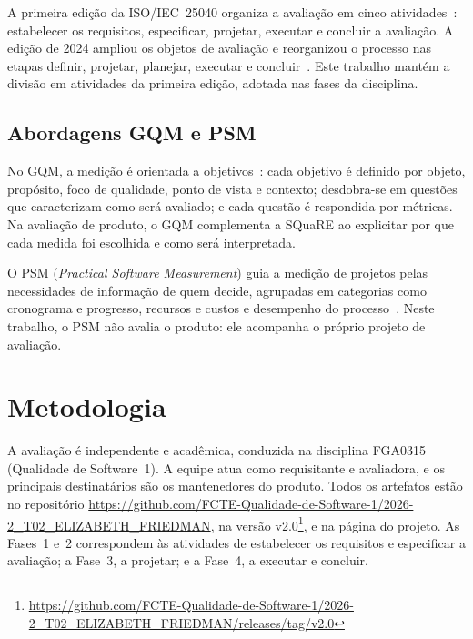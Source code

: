 \documentclass[12pt]{article}
\begin{document}
A primeira edição da ISO/IEC~25040 organiza a avaliação em cinco
atividades~\cite{iso25040v2011}: estabelecer os requisitos, especificar,
projetar, executar e concluir a avaliação. A edição de 2024 ampliou os objetos
de avaliação e reorganizou o processo nas etapas definir, projetar, planejar,
executar e concluir~\cite{iso25040}. Este trabalho mantém a divisão em
atividades da primeira edição, adotada nas fases da disciplina.

\subsection{Abordagens GQM e PSM}\label{subsec:gqm-psm}

No GQM, a medição é orientada a objetivos~\cite{basili1994gqm}: cada objetivo é
definido por objeto, propósito, foco de qualidade, ponto de vista e contexto;
desdobra-se em questões que caracterizam como será avaliado; e cada questão é
respondida por métricas. Na avaliação de produto, o GQM complementa a SQuaRE ao
explicitar por que cada medida foi escolhida e como será interpretada.

O PSM (\textit{Practical Software Measurement}) guia a medição de projetos pelas
necessidades de informação de quem decide, agrupadas em categorias como
cronograma e progresso, recursos e custos e desempenho do
processo~\cite{mcgarry2002psm}. Neste trabalho, o PSM não avalia o produto: ele
acompanha o próprio projeto de avaliação.

\section{Metodologia}\label{sec:metodologia}

A avaliação é independente e acadêmica, conduzida na disciplina FGA0315
(Qualidade de Software~1). A equipe atua como requisitante e avaliadora, e os
principais destinatários são os mantenedores do produto. Todos os artefatos estão
no repositório
\url{https://github.com/FCTE-Qualidade-de-Software-1/2026-2_T02_ELIZABETH_FRIEDMAN},
na versão v2.0\footnote{\url{https://github.com/FCTE-Qualidade-de-Software-1/2026-2_T02_ELIZABETH_FRIEDMAN/releases/tag/v2.0}},
e na página do projeto. As Fases~1 e~2 correspondem às atividades de
estabelecer os requisitos e especificar a avaliação; a Fase~3, a projetar; e a
Fase~4, a executar e concluir.
\end{document}
